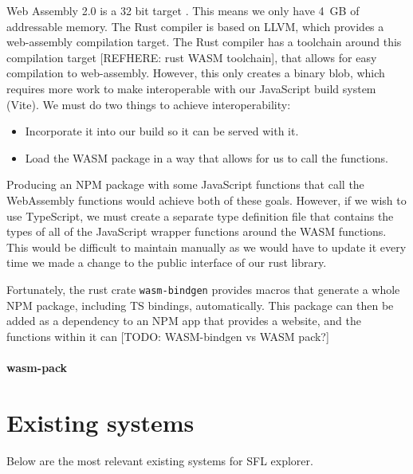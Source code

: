 Web Assembly 2.0 is a 32 bit target \cite{WebAssemblyCoreSpecification2}. This means we only have 4 GB of addressable memory. The Rust compiler is based on LLVM, which provides a web-assembly compilation target. The Rust compiler has a toolchain around this compilation target [REFHERE: rust WASM toolchain], that allows for easy compilation to web-assembly. However, this only creates a binary blob, which requires more work to make interoperable with our JavaScript build system (Vite). We must do two things to achieve interoperability:
\begin{itemize}
    \item Incorporate it into our build so it can be served with it.
    \item Load the WASM package in a way that allows for us to call the functions.
\end{itemize}
Producing an NPM package with some JavaScript functions that call the WebAssembly functions would achieve both of these goals. However, if we wish to use TypeScript, we must create a separate type definition file that contains the types of all of the JavaScript wrapper functions around the WASM functions. This would be difficult to maintain manually as we would have to update it every time we made a change to the public interface of our rust library. 

Fortunately, the rust crate \verb|wasm-bindgen| provides macros that generate a whole NPM package, including TS bindings, automatically. This package can then be added as a dependency to an NPM app that provides a website, and the functions within it can [TODO: WASM-bindgen vs WASM pack?]

\paragraph{wasm-pack}
\label{bg:wasm-pack}

\section{Existing systems}
Below are the most relevant existing systems for SFL explorer. 

